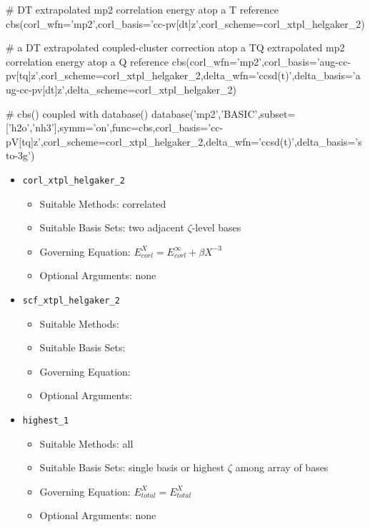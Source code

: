 
\begin{Snippet}
# DT extrapolated mp2 correlation energy atop a T reference 
cbs(corl_wfn='mp2',corl_basis='cc-pv[dt]z',corl_scheme=corl_xtpl_helgaker_2) 

# a DT extrapolated coupled-cluster correction atop a TQ extrapolated mp2 correlation energy atop a Q reference 
cbs(corl_wfn='mp2',corl_basis='aug-cc-pv[tq]z',corl_scheme=corl_xtpl_helgaker_2,delta_wfn='ccsd(t)',delta_basis='aug-cc-pv[dt]z',delta_scheme=corl_xtpl_helgaker_2) 

# cbs() coupled with database() 
database('mp2','BASIC',subset=['h2o','nh3'],symm='on',func=cbs,corl_basis='cc-pV[tq]z',corl_scheme=corl_xtpl_helgaker_2,delta_wfn='ccsd(t)',delta_basis='sto-3g')
\end{Snippet}


\begin{itemize}

\item \texttt{corl\_xtpl\_helgaker\_2}\cite{Halkier:1998:CBS}

   \begin{itemize}
   \item[] Suitable Methods: correlated
   \item[] Suitable Basis Sets: two adjacent $\zeta$-level bases
   \item[] Governing Equation: $E_{corl}^{X} = E_{corl}^{\infty} + \beta X^{-3}$
   \item[] Optional Arguments: none
   \end{itemize}

\item \texttt{scf\_xtpl\_helgaker\_2}

   \begin{itemize}
   \item[] Suitable Methods:
   \item[] Suitable Basis Sets:
   \item[] Governing Equation:
   \item[] Optional Arguments:
   \end{itemize}

\item \texttt{highest\_1}

   \begin{itemize}
   \item[] Suitable Methods: all
   \item[] Suitable Basis Sets: single basis or highest $\zeta$ among array of bases
   \item[] Governing Equation: $E_{total}^{X} = E_{total}^{X}$
   \item[] Optional Arguments: none
   \end{itemize}

\end{itemize}


